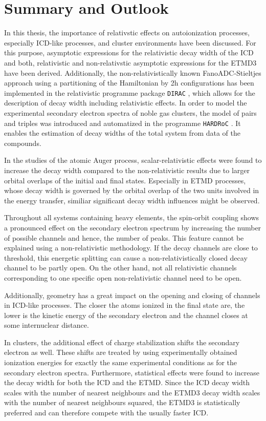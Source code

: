 \chapter{Summary and Outlook}

In this thesis, the importance of relativstic effects on autoionization
processes, especially \ac{ICD}-like
processes, and cluster environments have been discussed.
For this purpose, asymptotic expressions for the relativistic decay width of the ICD
and both, relativistic and non-relativstic asymptotic expressions for the ETMD3
have been derived. Additionally, the non-relativistically known
FanoADC-Stieltjes approach
using a partitioning of the Hamiltonian by 2h configurations has been implemented
in the relativistic programme package \verb|DIRAC| \cite{DIRAC13},
which allows for the
description of decay width including relativistic effects.
In order to model the experimental secondary electron spectra of noble gas
clusters, the model of pairs and triples was introduced and automatized in the
programme \verb|HARDRoC| \cite{HARDRoC}. It enables the estimation of
decay widths of the total system from data of the compounds.

In the studies of the atomic Auger process, scalar-relativistic effects were
found to increase the decay width compared to the non-relativistic results
due to larger orbital overlaps of the initial and final states. Especially
in ETMD processes, whose decay width is governed by the orbital overlap
of the two units involved in the energy transfer, similiar significant
decay width influences might be observed.

Throughout all systems containing heavy elements, the spin-orbit coupling
shows a pronounced effect on the secondary electron spectrum by increasing the
number of possible channels and hence, the number of peaks. This feature cannot
be explained using a non-relativistic methodology.
If the decay channels are close to threshold, this energetic splitting
can cause a non-relativistically closed decay channel to be partly open. On
the other hand, not all relativistic channels corresponding to one specific
open non-relativistic channel need to be open.

Additionally, geometry has a great impact on the opening and closing of channels
in \ac{ICD}-like processes. The closer the atoms ionized in the final state are,
the lower is the kinetic energy of the secondary electron and the channel
closes at some internuclear distance.

In clusters, the additional effect of charge stabilization shifts the secondary
electron as well. These shifts are treated by using experimentally obtained
ionization energies for exactly the same experimental conditions as for the
secondary electron spectra.
Furthermore, statistical effects were found to increase the decay width
for both the ICD and the ETMD. Since the ICD decay width scales with the number
of nearest neighbours and the ETMD3 decay width scales with the number of nearest
neighbours squared, the ETMD3 is statistically preferred and can therefore compete
with the usually faster ICD.

